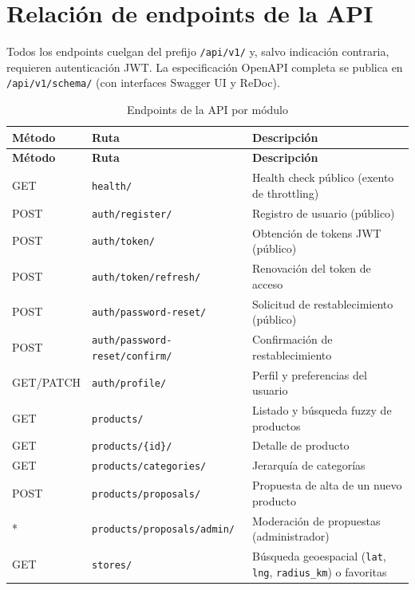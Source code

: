 

\chapter{Relación de endpoints de la API}\label{apendice-endpoints}

Todos los endpoints cuelgan del prefijo \texttt{/api/v1/} y, salvo indicación contraria,
requieren autenticación JWT. La especificación OpenAPI completa se publica en
\texttt{/api/v1/schema/} (con interfaces Swagger UI y ReDoc).

\begin{small}
\begin{longtable}{@{}llp{6.4cm}@{}}
\caption{Endpoints de la API por módulo}\label{tab:endpoints-completos}\\
\toprule
\textbf{Método} & \textbf{Ruta} & \textbf{Descripción} \\
\midrule
\endfirsthead
\toprule
\textbf{Método} & \textbf{Ruta} & \textbf{Descripción} \\
\midrule
\endhead
\bottomrule
\endfoot
GET & \texttt{health/} & Health check público (exento de throttling) \\
\midrule
POST & \texttt{auth/register/} & Registro de usuario (público) \\
POST & \texttt{auth/token/} & Obtención de tokens JWT (público) \\
POST & \texttt{auth/token/refresh/} & Renovación del token de acceso \\
POST & \texttt{auth/password-reset/} & Solicitud de restablecimiento (público) \\
POST & \texttt{auth/password-reset/confirm/} & Confirmación de restablecimiento \\
GET/PATCH & \texttt{auth/profile/} & Perfil y preferencias del usuario \\
\midrule
GET & \texttt{products/} & Listado y búsqueda fuzzy de productos \\
GET & \texttt{products/\{id\}/} & Detalle de producto \\
GET & \texttt{products/categories/} & Jerarquía de categorías \\
POST & \texttt{products/proposals/} & Propuesta de alta de un nuevo producto \\
* & \texttt{products/proposals/admin/} & Moderación de propuestas (administrador) \\
\midrule
GET & \texttt{stores/} & Búsqueda geoespacial (\texttt{lat}, \texttt{lng}, \texttt{radius\_km}) o favoritas \\

\end{longtable}
\end{small}
